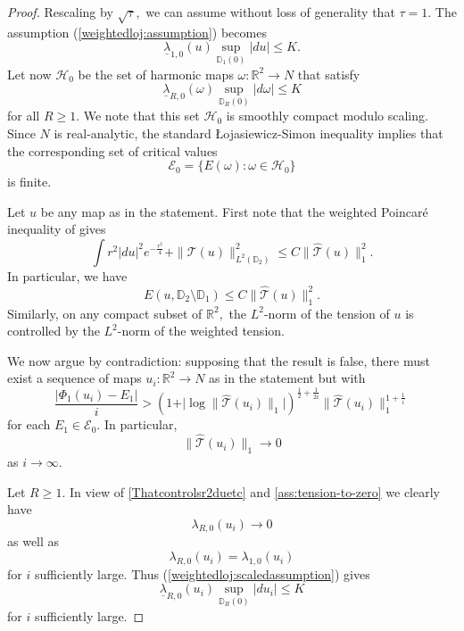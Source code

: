 \documentclass[10pt,reqno]{amsart}
\theoremstyle{plain}
\theoremstyle{definition}
\numberwithin{equation}{section}
\newcommand{\HH}{\mathcal{H}}
\newcommand{\om}{\omega}
\newcommand{\D}{\mathbb{D}}
\newcommand{\R}{\ensuremath{{\mathbb R}}}
\newcommand{\T}{{\mathcal T}}
\newcommand{\That}{{ \widehat{\T} }}
\newcommand{\beq}{\begin{equation}}
\newcommand{\eeq}{\end{equation}}
\newcommand{\abs}[1]{\vert#1\vert}
\begin{document}
\begin{proof} Rescaling by $\sqrt{\tau},$ we can assume without loss of generality that $\tau = 1.$ The assumption (\ref{weightedloj:assumption}) becomes
\begin{equation}\label{weightedloj:scaledassumption}
    \underline{\lambda}_{1, 0}(u) \sup_{\D_{1}(0)} |du| \leq K.
\end{equation}
Let now $\mathcal{H}_0$ be the set of  harmonic maps $\omega: \R^2 \to N$ that satisfy 
\begin{equation}\label{weightedloj:definitionofscrE0}
    \underline{\lambda}_{R, 0}(\omega) \sup_{\D_{R}(0)} |d\omega| \leq K
\end{equation}
for all $R \geq 1.$
We note that this set $\mathcal{H}_0$ is smoothly compact modulo scaling. Since $N$ is real-analytic, the standard \L ojasiewicz-Simon inequality \cite{leonsimon} implies that the corresponding set of critical values
$$\mathcal{E}_0=\lbrace E(\om): \om\in \HH_0 \rbrace$$
is finite.

Let $u$ be any map as in the statement. First note that the weighted Poincar\'e inequality of \cite[Lemma 2.1]{waldronweighted} gives
\begin{equation}\label{Thatcontrolsr2duetc}
\int r^2 |du|^2 e^{-\frac{r^2}{4}}  + \| \T(u) \|^2_{L^2(\D_2)} \leq C \| \That(u) \|_1^2.
\end{equation}
In particular, we have
\begin{equation}\label{energycontrolonannulus}
E(u, \D_2 \setminus \D_1) \leq C\| \That(u) \|_1^2.
\end{equation}
Similarly, on any compact subset of $\R^2,$ the $L^2$-norm of the tension of $u$ is controlled by the $L^2$-norm of the weighted tension.

We now argue by contradiction: supposing that the result is false, there must exist a sequence of maps $u_i : \R^2 \to N$ as in the statement
but with
\begin{equation}\label{weightedloj:contradloj}
    \frac{|\Phi_1(u_i) - E_1 |}{i} > \left( 1 + \abs{\log  \| \That(u_i) \|_1 }\right)^{\frac12 + \frac{1}{2i}} \| \That(u_i) \|_1^{1 + \frac{1}{i}}
\end{equation}
for each $E_1 \in \mathcal{E}_0.$ In particular,
\beq 
\label{ass:tension-to-zero}\| \That(u_i) \|_1 \to 0\eeq
as $i \to \infty.$

Let $R \geq 1.$ In view of 
\eqref{Thatcontrolsr2duetc} and \eqref{ass:tension-to-zero} we clearly have
\begin{equation*}
    \lambda_{R,0}(u_i) \to 0
\end{equation*}
as well as
\begin{equation*}
    \lambda_{R,0}(u_i) = \lambda_{1,0}(u_i)
\end{equation*}
for $i$ sufficiently large. Thus (\ref{weightedloj:scaledassumption}) gives
\begin{equation}\label{weightedloj:uiassumption}
    \underline{\lambda}_{R, 0}(u_i) \sup_{\D_{R}(0)} |du_i|  \leq K
\end{equation}
for $i$ sufficiently large.


\end{proof}
\end{document}
